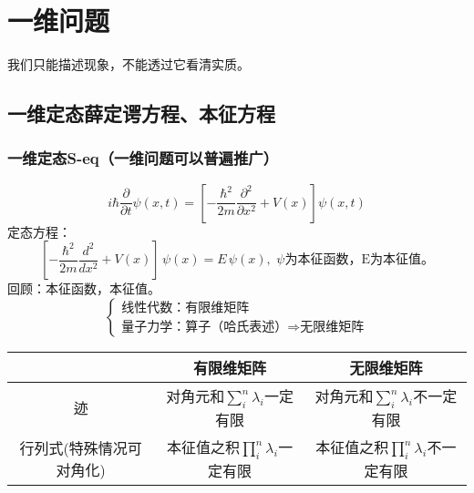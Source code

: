 \chapter{一维问题}
\begin{center}
    \textcolor[RGB]{255, 0, 0}{\faHeart}我们只能描述现象，不能透过它看清实质。\textcolor[RGB]{255, 0, 0}{\faHeart}
\end{center}
\vspace{-5pt}
\begin{center}
\end{center}

\section{一维定态薛定谔方程、本征方程}

\subsection{一维定态S-eq（一维问题可以普遍推广）}

$$
i\hbar \frac{\partial}{\partial t}\psi(x,t) = [-\frac{\hbar^2}{2m} \frac{\partial^2}{\partial x^2} + V(x)] \psi(x,t)
$$
定态方程：$$
[-\frac{\hbar^2}{2m} \frac{d^2}{d x^2} + V(x)] \, \psi(x) = E \,\psi(x), \,\, \psi\text{为本征函数，E为本征值。}$$
回顾：本征函数，本征值。
$$\left\{ \begin{matrix}
\text{线性代数：有限维矩阵}\\
\text{量子力学：算子（哈氏表述）} \Rightarrow \text{无限维矩阵}

\end{matrix}\right.$$

\begin{table}[htbp]
\centering

                        
\renewcommand\arraystretch{1.5}{

\begin{tabular}{|c|c|c|}
\hline
        &有限维矩阵 & 无限维矩阵 \\ \hline
    迹  & 对角元和$\sum_{i}^{n}{\lambda_i}$一定有限  & 对角元和$\sum_{i}^{n}{\lambda_i}$不一定有限 \\ \hline
行列式(特殊情况可对角化) & 本征值之积$\prod_{i}^{n}{\lambda_i}$一定有限 & 本征值之积$\prod_{i}^{n}{\lambda_i} $不一定有限  \\
\hline
\end{tabular}}
\end{table}


